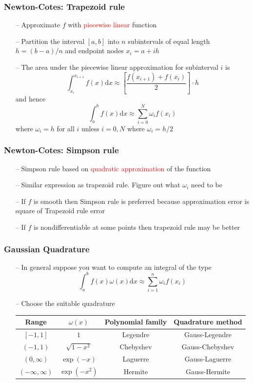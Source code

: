\documentclass[aspectratio=169, 11pt]{beamer}
\begin{document}
\begin{frame}
\frametitle{Newton-Cotes: Trapezoid rule}
  \begin{itemize}
    \item[--] Approximate $f$ with \textcolor{red}{piecewise linear} function
    \bigskip
    \item[--] Partition the interval $[a,b]$ into $n$ subintervals of equal length $h=(b-a)/n$ and endpoint nodes $x_{i}=a+ih$
    \bigskip
    \item[--] The area under the piecewise linear approximation for subinterval $i$ is
    \[
      \int_{x_{i}}^{x_{i+1}}f\left(x\right)\mathrm{d}x\approx\left[\frac{f\left(x_{i+1}\right)+f\left(x_{i}\right)}{2}\right]\cdot h
    \]
    and hence
    \[
      \int_{a}^{b}f\left(x\right)\mathrm{d}x\approx\sum_{i=0}^{N}\omega_{i}f\left(x_{i}\right)
    \]
    where $\omega_{i}=h$ for all $i$ unless $i=0,N$ where $\omega_{i}=h/2$
  \end{itemize}
\end{frame}

\begin{frame}
\frametitle{Newton-Cotes: Simpson rule}
  \begin{itemize}
    \item[--] Simpson rule based on \textcolor{red}{quadratic approximation} of the function
    \bigskip
    \item[--] Similar expression as trapezoid rule. Figure out what $\omega_{i}$ need to be
    \bigskip
    \item[--] If $f$ is smooth then Simpson rule is preferred because approximation error is square of Trapezoid rule error
    \bigskip
    \item[--] If $f$ is nondifferentiable at some points then trapezoid rule may be better
  \end{itemize}
\end{frame}

\begin{frame}
\frametitle{Gaussian Quadrature}
  \begin{itemize}
    \item[--] In general suppose you want to compute an integral of the type
    \[
      \int_{a}^{b}f\left(x\right)\omega\left(x\right)\mathrm{d}x\approx\sum_{i=1}^{n}\omega_{i}f\left(x_{i}\right)
    \]
    \bigskip
    \item[--] Choose the suitable quadrature

    \begin{table}
      \centering
      \begin{tabular}{cccc}
        \hline
        Range & $\omega\left(x\right)$ & Polynomial family  & Quadrature method\tabularnewline
        \hline
        $\left[-1,1\right]$ & $1$ & Legendre & Gauss-Legendre\tabularnewline
        $\left(-1,1\right)$ & $\sqrt{1-x^{2}}$ & Chebyshev & Gauss-Chebyshev\tabularnewline
        $\left(0,\infty\right)$ & $\exp\left(-x\right)$ & Laguerre & Gauss-Laguerre\tabularnewline
        $\left(-\infty,\infty\right)$ & $\exp\left(-x^{2}\right)$ & Hermite & Gauss-Hermite\tabularnewline
        \hline
      \end{tabular}
    \end{table}
  \end{itemize}
\end{frame}
\end{document}
